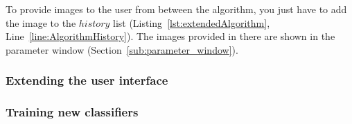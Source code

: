 To provide images to the user from between the algorithm, you just have to add the image to the $history$ list (Listing~\ref{lst:extendedAlgorithm}, Line~\ref{line:AlgorithmHistory}). The images provided in there are shown in the parameter window (Section~\ref{sub:parameter_window}).

\subsubsection{Extending the user interface}
\subsubsection{Training new classifiers}